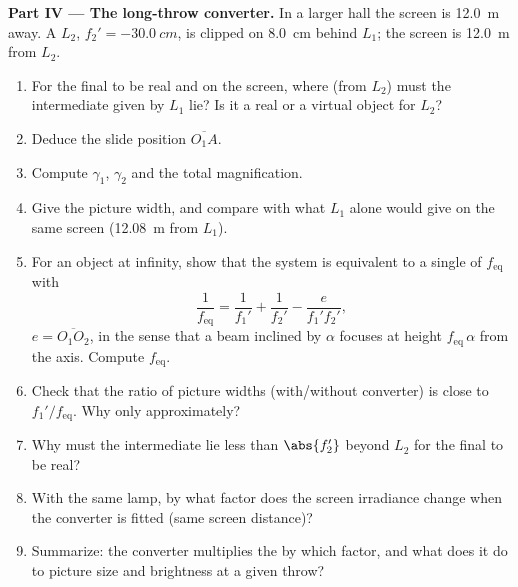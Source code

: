 \begin{problem}
\medskip
\noindent\textbf{Part IV --- The long-throw converter.}
In a larger hall the screen is \qty{12.0}{m} away. A 
$L_2$, $f_2' = \qty{-30.0}{cm}$, is clipped on \qty{8.0}{cm} behind
$L_1$; the screen is \qty{12.0}{m} from $L_2$.
\begin{enumerate}[resume]
  \item For the final  to be real and on the screen, where (from
        $L_2$) must the intermediate  given by $L_1$ lie? Is it a
        real or a virtual object for $L_2$?
  \item Deduce the slide position $\overline{O_1A}$.
  \item Compute $\gamma_1$, $\gamma_2$ and the total magnification.
  \item Give the picture width, and compare with what $L_1$ alone would
        give on the same screen (\qty{12.08}{m} from $L_1$).
  \item For an object at infinity, show that the system is equivalent
        to a single  of  $f_{\mathrm{eq}}$ with
        \[
        \frac{1}{f_{\mathrm{eq}}} = \frac{1}{f_1'} + \frac{1}{f_2'} - \frac{e}{f_1' f_2'},
        \]
        $e = \overline{O_1O_2}$, in the sense that a beam inclined by
        $\alpha$ focuses at height $f_{\mathrm{eq}}\,\alpha$ from the
        axis. Compute $f_{\mathrm{eq}}$.
  \item Check that the ratio of picture widths (with/without converter)
        is close to $f_1'/f_{\mathrm{eq}}$. Why only approximately?
  \item Why must the intermediate  lie less than $\abs{f_2'}$
        beyond $L_2$ for the final  to be real?
  \item With the same lamp, by what factor does the screen irradiance
        change when the converter is fitted (same screen distance)?
  \item Summarize: the converter multiplies the  by which
        factor, and what does it do to picture size and brightness at a
        given throw?
\end{enumerate}
\end{problem}
